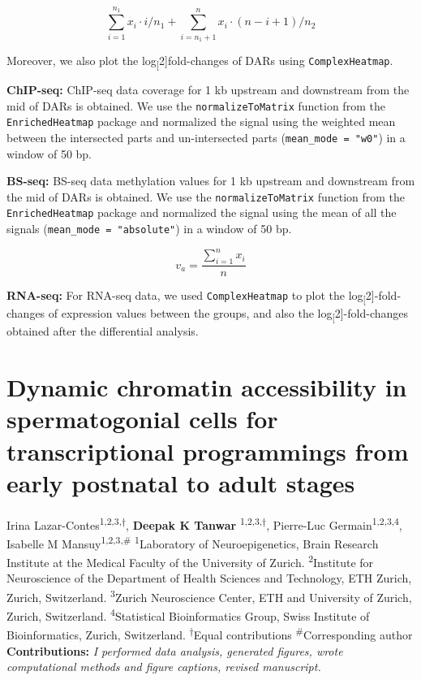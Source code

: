 \documentclass[12pt,twoside]{reedthesis}
\begin{document}
\[
\sum_{i=1}^{n_{1}} x_{i} \cdot i / n_{1}+\sum_{i=n_{1}+1}^{n} x_{i} \cdot(n-i+1) / n_{2}
\]

Moreover, we also plot the log\textsubscript[2{]}fold-changes of DARs using
\texttt{ComplexHeatmap}.

\textbf{ChIP-seq:} ChIP-seq data coverage for 1 kb upstream and downstream
from the mid of DARs is obtained. We use the \texttt{normalizeToMatrix} function
from the \texttt{EnrichedHeatmap} package and normalized the signal using the
weighted mean between the intersected parts and un-intersected parts
(\texttt{mean\_mode\ =\ "w0"}) in a window of 50 bp.

\textbf{BS-seq:} BS-seq data methylation values for 1 kb upstream and
downstream from the mid of DARs is obtained. We use the
\texttt{normalizeToMatrix} function from the \texttt{EnrichedHeatmap} package and
normalized the signal using the mean of all the signals (\texttt{mean\_mode\ =\ "absolute"}) in a window of 50 bp.

\[
v_{a}=\frac{\sum_{i=1}^{n} x_{i}}{n}
\]

\textbf{RNA-seq:} For RNA-seq data, we used \texttt{ComplexHeatmap} to plot the
log\textsubscript[2{]}-fold-changes of expression values between the groups, and also the
log\textsubscript[2{]}-fold-changes obtained after the differential analysis.

\hypertarget{chapter1}{%
\chapter{Dynamic chromatin accessibility in spermatogonial cells for transcriptional programmings from early postnatal to adult stages}\label{chapter1}}

Irina Lazar-Contes\textsuperscript{1,2,3,$\dagger$}, \textbf{Deepak K Tanwar} \textsuperscript{1,2,3,$\dagger$}, Pierre-Luc
Germain\textsuperscript{1,2,3,4}, Isabelle M
Mansuy\textsuperscript{1,2,3,\#}\newline \newline
\textsuperscript{1}Laboratory of Neuroepigenetics, Brain Research
Institute at the Medical Faculty of the University of Zurich. \newline
\textsuperscript{2}Institute for Neuroscience of the Department of
Health Sciences and Technology, ETH Zurich, Zurich, Switzerland.\newline
\textsuperscript{3}Zurich Neuroscience Center, ETH and University of
Zurich, Zurich, Switzerland. \newline \textsuperscript{4}Statistical
Bioinformatics Group, Swiss Institute of Bioinformatics, Zurich,
Switzerland. \newline \newline \textsuperscript{$\dagger$}Equal
contributions \newline\newline \textsuperscript{\#}Corresponding
author \newline\newline 
\textbf{Contributions:} \emph{I performed data analysis, generated figures, wrote computational methods and figure captions, revised manuscript.}
\end{document}
